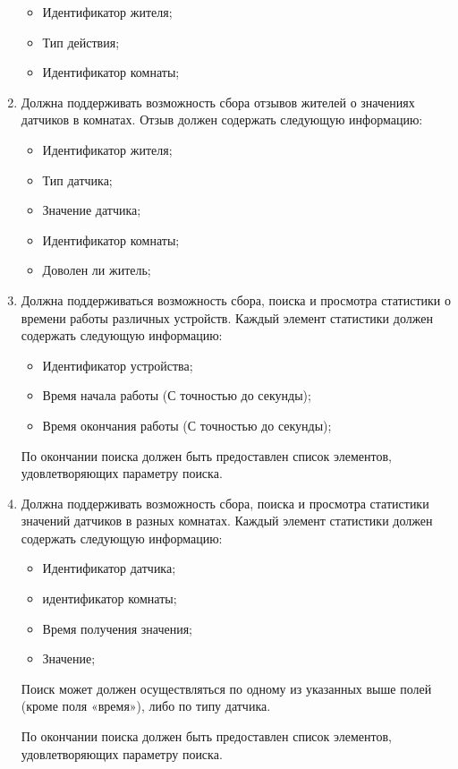 \begin{enumerate}
            \begin{itemize}
              \item Идентификатор жителя;
	            \item Тип действия;
	            \item Идентификатор комнаты; 
            \end{itemize}
        \item Должна поддерживать возможность сбора отзывов жителей о значениях датчиков в комнатах. Отзыв должен содержать следующую  информацию: 
            \begin{itemize}
              \item Идентификатор жителя;
	            \item Тип датчика;
	            \item Значение датчика;
	            \item Идентификатор комнаты;
	            \item Доволен ли житель;
            \end{itemize}
        \item Должна поддерживаться возможность сбора, поиска и просмотра статистики о времени работы различных устройств. Каждый элемент статистики должен содержать следующую информацию:
          \begin{itemize}
            \item Идентификатор устройства;
            \item Время начала работы (С точностью до секунды);
            \item Время окончания работы (С точностью до секунды);
          \end{itemize}          
          По окончании поиска должен быть предоставлен список элементов, удовлетворяющих параметру поиска.
        \item Должна поддерживать возможность сбора, поиска и просмотра статистики значений датчиков в разных комнатах. Каждый элемент статистики должен содержать следующую информацию:
          \begin{itemize}
            \item Идентификатор датчика;
	          \item идентификатор комнаты;
	          \item Время получения значения;
	          \item Значение;
          \end{itemize}
          
          Поиск может должен осуществляться по одному из указанных выше полей (кроме поля «время»), либо по типу датчика.
          
          По окончании поиска должен быть предоставлен список элементов, удовлетворяющих параметру поиска. 
      \end{enumerate}
